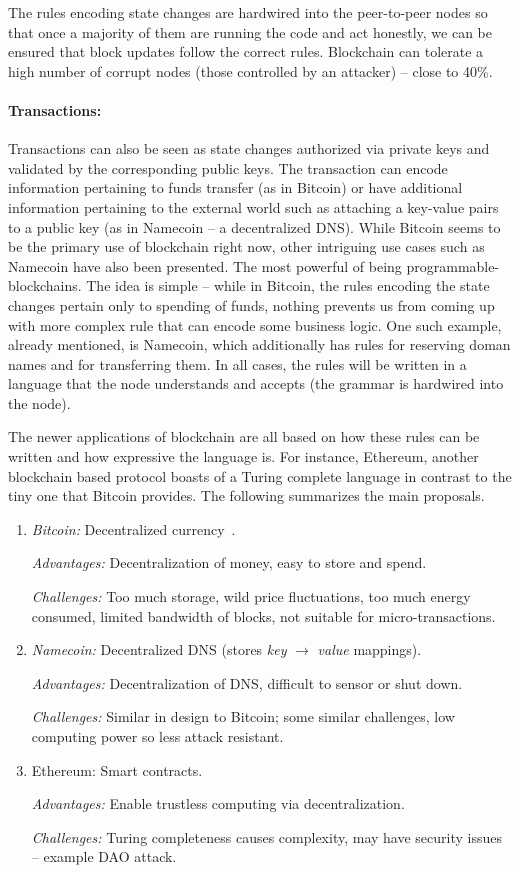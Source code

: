 \documentclass[]{report}   %
\begin{document}
{The rules encoding state changes are hardwired into the peer-to-peer nodes so that once a majority of them are running the code and act honestly, we can be ensured that block updates follow the correct rules. Blockchain can tolerate a high number of corrupt nodes (those controlled by an attacker) -- close to 40\%. 

\paragraph{Transactions:} Transactions can also be seen as state changes authorized via private keys and validated by the corresponding public keys. The transaction can encode information pertaining to funds transfer (as in Bitcoin) or have additional information pertaining to the external world such as attaching a key-value pairs to a public key (as in Namecoin -- a decentralized DNS).
While Bitcoin seems to be the primary use of blockchain right now, other intriguing use cases such as Namecoin have also been presented. The most powerful of being programmable-blockchains. The idea is simple -- while in Bitcoin, the rules encoding the state changes pertain only to spending of funds, nothing prevents us from coming up with more complex rule that can encode some business logic. One such example, already mentioned, is Namecoin, which additionally has rules for reserving doman names and for transferring them. In all cases, the rules will be written in a language that the node understands and accepts (the grammar is hardwired into the node). 

The newer applications of blockchain are all based on how these rules can be written and how expressive the language is. For instance, Ethereum, another blockchain based protocol boasts of a Turing complete language in contrast to the tiny one that Bitcoin provides. The following summarizes the main proposals.

%
\begin{enumerate}
	\item {\em Bitcoin:} Decentralized currency~\cite{Nakamoto2008,}.
	
		{\em Advantages:} Decentralization of money, easy to store and spend.
		
		{\em Challenges:} Too much storage, wild price fluctuations, too much energy consumed, limited bandwidth of blocks, not suitable for micro-transactions.
	\item {\em Namecoin:} Decentralized DNS (stores {\em key} $\rightarrow$ {\em value} mappings). 

		{\em Advantages:} Decentralization of DNS, difficult to sensor or shut down.
		
		{\em Challenges:} Similar in design to Bitcoin; some similar challenges, low computing power so less attack resistant.
	
	\item {Ethereum:} Smart	contracts.
	
	  {\em Advantages:} Enable trustless computing via decentralization.		
		
		{\em Challenges:} Turing completeness causes complexity, may have security issues -- example DAO attack.
	
\end{enumerate}
}
\end{document}
